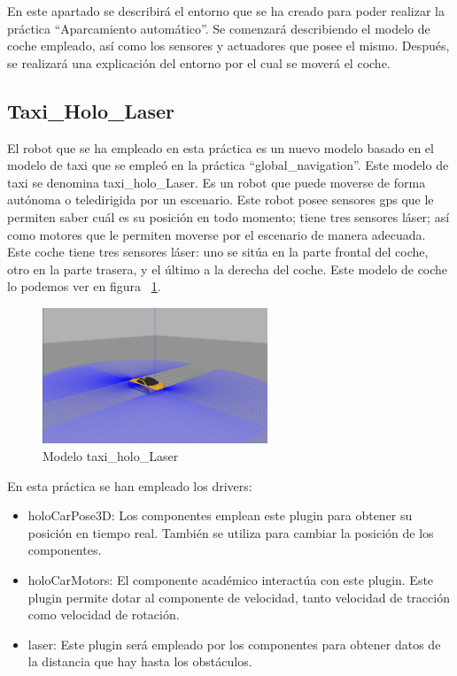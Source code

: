 En este apartado se describirá el entorno que se ha creado para poder realizar la práctica ``Aparcamiento automático''. Se comenzará describiendo el modelo de coche empleado, así como los sensores y actuadores que posee el mismo. Después, se realizará una explicación del entorno por el cual se moverá el coche.

\subsection{Taxi\_Holo\_Laser}
El robot que se ha empleado en esta práctica es un nuevo modelo basado en el modelo de taxi que se empleó en la práctica ``global\_navigation''. Este modelo de taxi se denomina taxi\_holo\_Laser. Es un robot que puede moverse de forma autónoma o teledirigida por un escenario. Este robot posee sensores \acrshort{gps} que le permiten saber cuál es su posición en todo momento; tiene tres sensores láser; así como motores que le permiten moverse por el escenario de manera adecuada.\\


Este coche tiene tres sensores láser: uno se sitúa en la parte frontal del coche, otro en la parte trasera, y el último a la derecha del coche. Este modelo de coche lo podemos ver en figura ~\ref{fig.taxiAutopark}.\\

\begin{figure}[H]
  \begin{center}
    \includegraphics[width=0.6\textwidth]{figures/Autopark/taxiAutopark.png}
		\caption{Modelo taxi\_holo\_Laser}
		\label{fig.taxiAutopark}
		\end{center}
\end{figure}

En esta práctica se han empleado los drivers:

\begin{itemize}
\item holoCarPose3D: Los componentes emplean este plugin para obtener su posición en tiempo real. También se utiliza para cambiar la posición de los componentes.
\item	holoCarMotors: El componente académico interactúa con este plugin. Este plugin permite dotar al componente de velocidad, tanto velocidad de tracción como velocidad de rotación.
\item	laser: Este plugin será empleado por los componentes para obtener datos de la distancia que hay hasta los obstáculos.
\end{itemize}

